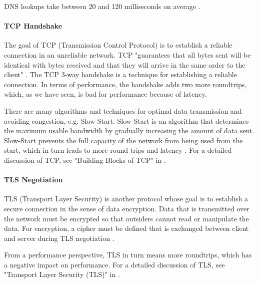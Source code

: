 DNS lookups take between 20 and 120 milliseconds on average \cite{2018KeyCDN}.





\paragraph{TCP Handshake} %

The goal of TCP (Transmission Control Protocol) is to establish a reliable connection in an unreliable network.
TCP  "guarantees that all bytes sent will be identical with bytes received and that they will arrive in the same order to the client" \cite{2013Grigorik}.
The TCP 3-way handshake is a technique for establishing a reliable connection.
In terms of performance, the handshake adds two more roundtrips, which, as we have seen, is bad for performance because of latency.

There are many algorithms and techniques for optimal data transmission and avoiding congestion, e.g. Slow-Start.
Slow-Start is an algorithm that determines the maximum usable bandwidth by gradually increasing the amount of data sent.
Slow-Start prevents the full capacity of the network from being used from the start, which in turn leads to more round trips and latency \cite{2013Grigorik}.
For a detailed discussion of TCP, see "Building Blocks of TCP" in \cite{2013Grigorik}.





\paragraph{TLS Negotiation} %

TLS (Transport Layer Security) is another protocol whose goal is to establish a secure connection in the sense of data encryption.
Data that is transmitted over the network must be encrypted so that outsiders cannot read or manipulate the data.
For encryption, a cipher must be defined that is exchanged between client and server during TLS negotiation \cite{2021MDNHowBrowsersWork}.

From a performance perspective, TLS in turn means more roundtrips, which has a negative impact on performance.
For a detailed discussion of TLS, see "Transport Layer Security (TLS)" in \cite{2013Grigorik}.

